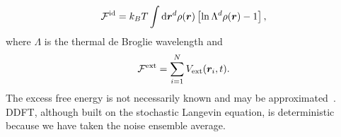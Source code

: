 %
\begin{equation}
  \mathcal{F}^{\mathrm{id}} = k_B T \int \mathop{}\!\mathrm{d} \bm{r}^d \rho(\bm{r} )
  \left[\ln{\Lambda^d \rho(\bm{r} )} - 1\right],
\end{equation}
%
where $\Lambda$ is the thermal de Broglie wavelength and
%
\begin{equation}
  \mathcal{F}^{\mathrm{ext}} = \sum^N_{i=1} V_{\mathrm{ext}}(\bm{r}_i, t).
\end{equation}
%
The excess free energy is not necessarily known and may be
approximated~\cite{hansen_theory_06}.  DDFT, although built on the stochastic
Langevin equation, is deterministic~\cite{archer_dynamical_04a} because we have
taken the noise ensemble average.
